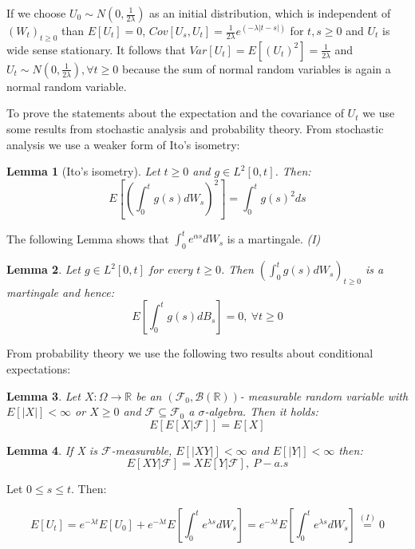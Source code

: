 \documentclass[%
thesis=student,%
coverpage=false,%
titlepage=false,%
headmarks=true, %
english,%
font=libertine, %
math=newpxtx, %
BCOR=5mm,%
coverBCOR=11mm%
]{tumbook}
\newtheorem{lemma}{Lemma}
\begin{document}
If we choose $U_{0} \sim N(0,\frac{1}{2\lambda})$ as an initial distribution, which is independent of $(W_{t})_{t\geq 0}$ than $E[U_{t}] = 0$, $Cov[U_{s},U_{t}] = \frac{1}{2\lambda}e^{(-\lambda\lvert t-s \rvert)}$ for $t,s \geq 0$ and $U_{t}$ is wide sense stationary. It follows that $Var[U_{t}]=E[(U_{t})^{2}]=\frac{1}{2\lambda}$ and $U_{t} \sim N(0,\frac{1}{2\lambda}), \forall t \geq 0$ because the sum of normal random variables is again a normal random variable.

To prove the statements about the expectation and the covariance of $U_{t}$ we use some results from stochastic analysis and probability theory.
From stochastic analysis we use a weaker form of Ito's isometry:

\begin{lemma}[Ito's isometry]
 Let $t \geq 0$ and $g \in L^2[0,t]$. Then:
 \[
 E[(\int_{0}^{t}g(s)dW_{s})^{2}] = \int_{0}^{t}g(s)^2ds
 \]
\end{lemma}

The following Lemma shows that $\int_{0}^{t}e^{\alpha s}dW_{s}$ is a martingale.   \textit{(I)}

\begin{lemma}
    Let $g \in L^2[0,t]$ for every $t \geq 0$. Then $(\int_{0}^{t}g(s)dW_{s})_{t\geq 0}$ is a martingale and hence:
    \[
    E[\int_{0}^{t}g(s)dB_{s}] = 0, \ \forall t \geq 0
    \]
\end{lemma}

From probability theory we use the following two results about conditional expectations:

\begin{lemma}
    Let $X: \Omega \rightarrow \mathbb{R}$ be an $(\mathcal{F}_{0},\mathcal{B}(\mathbb{R}))$- measurable random variable with $E[\lvert X \rvert] < \infty$ or $X \geq 0$ and $\mathcal{F} \subseteq \mathcal{F}_{0}$ a $\sigma$-algebra. Then it holds:
    \[
    E[E[X|\mathcal{F}]] = E[X]
    \]
\end{lemma}

\begin{lemma}
    If X is $\mathcal{F}$-measurable, $E[\lvert XY \rvert] < \infty$ and $E[\lvert Y \rvert]< \infty$ then:
    \[
    E[XY|\mathcal{F}] = XE[Y|\mathcal{F}], \ P-a.s
    \]
\end{lemma}

Let $0 \leq s \leq t$. Then:

\[
E[U_{t}] = e^{-\lambda t}E[U_{0}] + e^{-\lambda t}E[\int_{0}^{t} e^{\lambda s} dW_{s}] = e^{-\lambda t}E[\int_{0}^{t} e^{\lambda s} dW_{s}] \stackrel{(I)}{=}  0
\]
\end{document}
